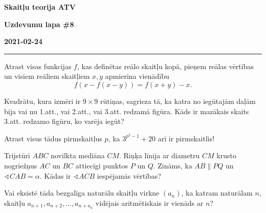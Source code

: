 \documentclass[a4paper,12pt]{article}
\begin{document}
\clearpage
\begin{center}
\parbox{3.5cm}{\flushleft\bf Skaitļu teorija \newline ATV} \hfill {\bf\LARGE Uzdevumu lapa \#8} \hfill \parbox{3.5cm}{\flushright\bf 2021-02-24} %
\end{center}

\hrule



\vspace{10pt}
\begin{problem}
Atrast visas funkcijas $f$, kas definētas reālo skaitļu kopā, pieņem reālas vērtības un visiem reāliem skaitļiem $x,y$
apmierina vienādību
\[ f(x - f(x - y)) = f(x + y) - x. \]
\end{problem}

\vspace{10pt}
\begin{problem}
Kvadrātu, kura izmēri ir $9 \times 9$ rūtiņas, sagrieza tā, ka katra no iegūtajām daļām bija vai nu 1.att., vai 2.att., vai
3.att. redzamā figūra. Kāds ir mazākais skaits 3.att. redzamo figūru, ko varēja iegūt?

\end{problem}


\vspace{10pt}
\begin{problem}
Atrast visus tādus pirmskaitļus $p$, ka $3^{p^2 - 1} + 20$ arī ir pirmskaitlis!
\end{problem}



\vspace{10pt}
\begin{problem}
Trijstūrī $ABC$ novilkta mediāna $CM$. Riņķa līnija ar diametru $CM$ krusto nogriežņus $AC$ un $BC$ attiecīgi punktos $P$ un $Q$. 
Zināms, ka $AB  \parallel PQ$ un $\sphericalangle CAB = \alpha$. 
Kādas ir $\sphericalangle ACB$ iespējamās vērtības?

\end{problem}



\vspace{10pt}
\begin{problem}
Vai eksistē tāda bezgalīga naturālu skaitļu virkne $(a_n)$, ka katram naturālam $n$, 
skaitļu $a_{n+1},a_{n+2}, \ldots, a_{n+a_n}$ vidējais
aritmētiskais ir vienāds ar $n$?
\end{problem}
\end{document}
